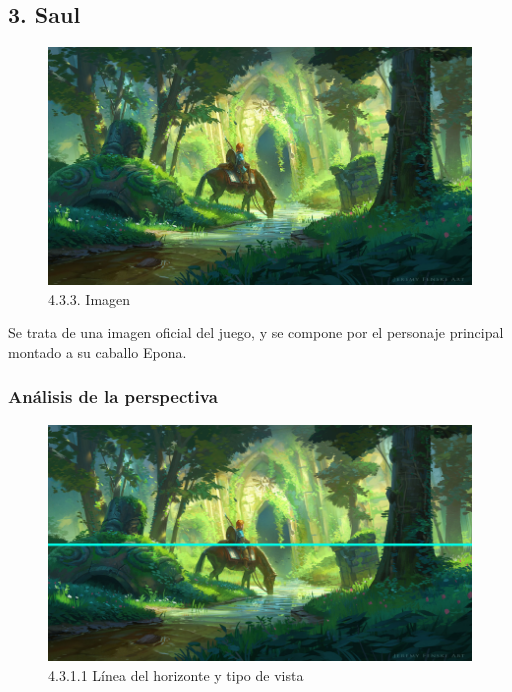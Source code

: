 \documentclass[12pt]{article}
\begin{document}
    \subsection{3. Saul}
    \begin{figure}[H]
      \centering
      \includegraphics[width=\textwidth]{images/Saúl/Sección 3/EA_img3_0Main.png}
      \caption{\small 4.3.3. Imagen}
    \end{figure}
    Se trata de una imagen oficial del juego, y se compone por el personaje principal montado a su caballo Epona.

    
        \subsubsection{Análisis de la perspectiva}


    \begin{figure}[H]
      \centering
      \includegraphics[width=\textwidth]{images/Saúl/Sección 3/EA_img3_1Perspectiva_1LineaTierra-TipoVista.png}
      \caption{\small 4.3.1.1 Línea del horizonte y tipo de vista}
    \end{figure}
\end{document}
